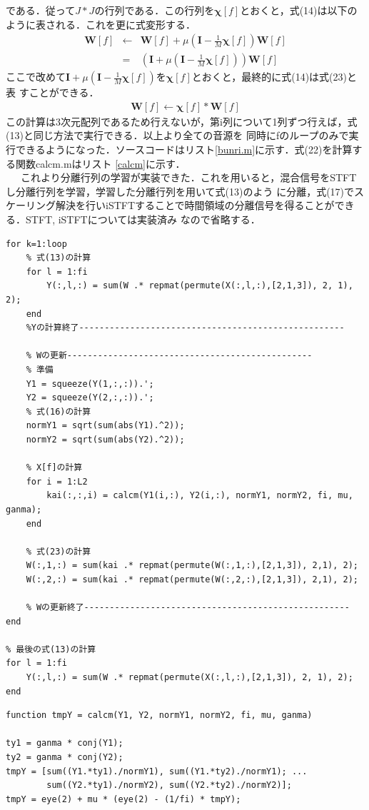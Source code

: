 \documentclass[a4j]{jarticle}
\begin{document}
である．従って$J*J$の行列である．この行列を$\bm{\chi}[f]$とおくと，式(14)は以下のように表される．これを更に式変形する．
\begin{eqnarray}
 \bm{W}[f] &\leftarrow & \bm{W}[f] + \mu \left(\bm{I} - \frac{1}{M} \bm{\chi}[f] \right)\bm{W}[f] \nonumber \\
 &=& \left(\bm{I} + \mu \left(\bm{I} - \frac{1}{M} \bm{\chi}[f] \right) \right) \bm{W}[f] \nonumber
\end{eqnarray}
ここで改めて$\bm{I} + \mu \left(\bm{I} - \frac{1}{M} \bm{\chi}[f] \right)$を$\bm{\chi}[f]$とおくと，最終的に式(14)は式(23)と表
すことができる．
\begin{eqnarray}
 \bm{W}[f] \leftarrow \bm{\chi}[f] * \bm{W}[f]
\end{eqnarray}
この計算は3次元配列であるため行えないが，第i列について1列ずつ行えば，式(13)と同じ方法で実行できる．以上より全ての音源を
同時にfのループのみで実行できるようになった．ソースコードはリスト\ref{bunri.m}に示す．式(22)を計算する関数calcm.mはリスト
\ref{calcm}に示す．\\\ \ \ 
これより分離行列の学習が実装できた．これを用いると，混合信号をSTFTし分離行列を学習，学習した分離行列を用いて式(13)のよう
に分離，式(17)でスケーリング解決を行いiSTFTすることで時間領域の分離信号を得ることができる．STFT, iSTFTについては実装済み
なので省略する．

\begin{lstlisting}[caption=bunri.m, xleftmargin=1cm, label=bunri.m]
% 反復計算
for k=1:loop
    % 式(13)の計算
    for l = 1:fi
        Y(:,l,:) = sum(W .* repmat(permute(X(:,l,:),[2,1,3]), 2, 1), 2);
    end
    %Yの計算終了----------------------------------------------------
    
    % Wの更新------------------------------------------------
    % 準備
    Y1 = squeeze(Y(1,:,:)).';
    Y2 = squeeze(Y(2,:,:)).';
    % 式(16)の計算
    normY1 = sqrt(sum(abs(Y1).^2));
    normY2 = sqrt(sum(abs(Y2).^2));
    
    % X[f]の計算
    for i = 1:L2
        kai(:,:,i) = calcm(Y1(i,:), Y2(i,:), normY1, normY2, fi, mu, ganma);
    end

    % 式(23)の計算
    W(:,1,:) = sum(kai .* repmat(permute(W(:,1,:),[2,1,3]), 2,1), 2); 
    W(:,2,:) = sum(kai .* repmat(permute(W(:,2,:),[2,1,3]), 2,1), 2); 

    % Wの更新終了----------------------------------------------------
end

% 最後の式(13)の計算
for l = 1:fi
    Y(:,l,:) = sum(W .* repmat(permute(X(:,l,:),[2,1,3]), 2, 1), 2);
end
\end{lstlisting}
\begin{lstlisting}[caption=calcm.m, xleftmargin=1cm, label=calcm]
function tmpY = calcm(Y1, Y2, normY1, normY2, fi, mu, ganma)

ty1 = ganma * conj(Y1);
ty2 = ganma * conj(Y2);
tmpY = [sum((Y1.*ty1)./normY1), sum((Y1.*ty2)./normY1); ...
        sum((Y2.*ty1)./normY2), sum((Y2.*ty2)./normY2)];
tmpY = eye(2) + mu * (eye(2) - (1/fi) * tmpY);
\end{lstlisting}
\end{document}

